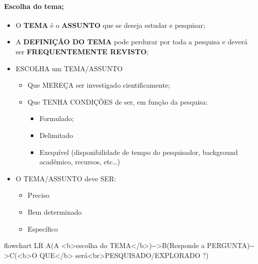 \documentclass[
]{book}
\newenvironment{Shaded}{\begin{snugshade}}{\end{snugshade}}
\newcommand{\NormalTok}[1]{#1}
\providecommand{\tightlist}{%
  \setlength{\itemsep}{0pt}\setlength{\parskip}{0pt}}
\begin{document}
\hypertarget{escolha-do-tema}{%
\paragraph{Escolha do tema;}\label{escolha-do-tema}}

\begin{itemize}
\tightlist
\item
  O \textbf{TEMA} é o \textbf{ASSUNTO} que se deseja estudar e pesquisar;
\item
  A \textbf{DEFINIÇÃO DO TEMA} pode perdurar por toda a pesquisa e deverá ser \textbf{FREQUENTEMENTE REVISTO};
\item
  ESCOLHA um TEMA/ASSUNTO

  \begin{itemize}
  \tightlist
  \item
    Que MEREÇA ser investigado cientificamente;
  \item
    Que TENHA CONDIÇÕES de ser, em função da pesquisa:

    \begin{itemize}
    \tightlist
    \item
      Formulado;
    \item
      Delimitado
    \item
      Exequível (disponibilidade de tempo do pesquisador, background acadêmico, recursos, etc\ldots)
    \end{itemize}
  \end{itemize}
\item
  O TEMA/ASSUNTO deve SER:

  \begin{itemize}
  \tightlist
  \item
    Preciso
  \item
    Bem determinado
  \item
    Específico
  \end{itemize}
\end{itemize}

\begin{Shaded}
\begin{Highlighting}[]
\NormalTok{flowchart LR}
\NormalTok{A(A \textless{}b\textgreater{}escolha do TEMA\textless{}/b\textgreater{}){-}{-}\textgreater{}B(Responde a PERGUNTA){-}{-}\textgreater{}C(\textless{}b\textgreater{}O QUE\textless{}/b\textgreater{} será\textless{}br\textgreater{}PESQUISADO/EXPLORADO ?)}
\end{Highlighting}
\end{Shaded}
\end{document}
